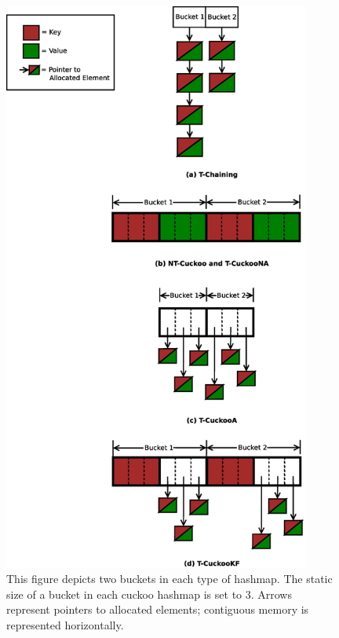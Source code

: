 \begin{figure}[H]
\centering
\includegraphics[width=0.9\textwidth]{hashmap_finds}
    \caption[Bucket Structure of Different Hashmaps]{This figure depicts two buckets in each type of hashmap. The static size of a bucket in each cuckoo hashmap is set to 3. Arrows represent pointers to allocated elements; contiguous memory is represented horizontally.}
\label{fig:hashmap_buckets}
\end{figure}

